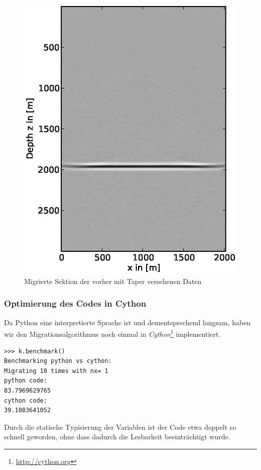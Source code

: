 \documentclass[12pt,a4paper]{scrartcl}
\begin{document}
\begin{figure}[htb]
\centering
\includegraphics[width=1\textwidth]{tapered_20trc}
\caption{Migrierte Sektion der vorher mit Taper versehenen Daten}
\label{tapered_20trc}
\end{figure}

\clearpage
\subsubsection*{Optimierung des Codes in Cython}

Da Python eine interpretierte Sprache ist und dementsprechend langsam, haben wir den Migrationsalgorithmus noch einmal in \textit{Cython}\footnote{\url{http://cython.org}} implementiert.


\begin{verbatim}
>>> k.benchmark()
Benchmarking python vs cython:
Migrating 10 times with nx= 1
python code:
83.7969629765
cython code:
39.1083641052
\end{verbatim}

Durch die statische Typisierung der Variablen ist der Code etwa doppelt so schnell geworden, ohne dass dadurch die Lesbarkeit beeinträchtigt wurde. 
\end{document}
